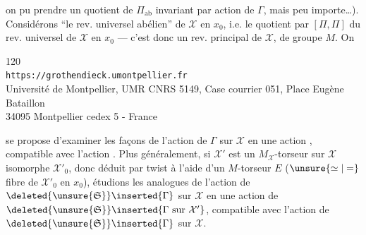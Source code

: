 on  pu prendre un quotient de $\Pi_{\mathrm{ab}}$ invariant par
action de $\Gamma$, mais peu importe\ldots).
Considérons ``le rev. universel abélien''  de
$\mathcal X$ en $x_0$, i.e. le quotient par $[\Pi,\Pi]$ du rev. universel de
$\mathcal X$ en $x_0$ --- c'est donc un rev. principal de $\mathcal X$, de
groupe $M$. On


\begin{center}
\small
120\\
\texttt{https://grothendieck.umontpellier.fr}\\
Université de Montpellier, UMR CNRS 5149, Case courrier 051, Place Eugène Bataillon\\
34095 Montpellier cedex 5 - France
\end{center}

se propose d'examiner les façons de 
l'action de $\Gamma$ sur $\mathcal X$  en une
action , compatible
avec l'action 
.
Plus généralement, si $\mathcal X'$ est un $M_{\mathcal X}$-torseur sur
$\mathcal X$ isomorphe  $\mathcal X'_0$, donc déduit
 par twist à l'aide
d'un $M$-torseur $E$ ($\unsure{\simeq|=}$ fibre de $\mathcal X'_0$ en $x_0$),
étudions les  analogues de l'action
de $\deleted{\unsure{\mathfrak S}}\inserted{\Gamma}$ sur $\mathcal X$ en une
action de $\deleted{\unsure{\mathfrak S}}\inserted{\Gamma\text{ sur }\mathcal X'}$,
compatible avec l'action de
$\deleted{\unsure{\mathfrak S}}\inserted{\Gamma}$ sur $\mathcal X$.


